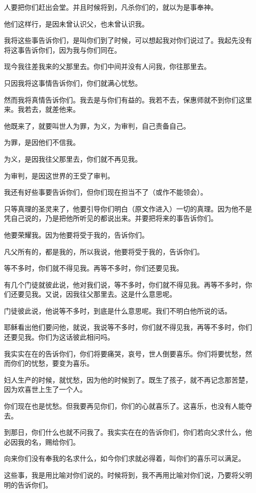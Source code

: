 \documentclass[12pt,oneside]{book}
\begin{document}
人要把你们赶出会堂。并且时候将到，凡杀你们的，就以为是事奉神。

他们这样行，是因未曾认识父，也未曾认识我。

我将这些事告诉你们，是叫你们到了时候，可以想起我对你们说过了。我起先没有将这事告诉你们，因为我与你们同在。

现今我往差我来的父那里去。你们中间并没有人问我，你往那里去。

只因我将这事情告诉你们，你们就满心忧愁。

然而我将真情告诉你们。我去是与你们有益的。我若不去，保惠师就不到你们这里来。我若去，就差他来。

他既来了，就要叫世人为罪，为义，为审判，自己责备自己。

为罪，是因他们不信我。

为义，是因我往父那里去，你们就不再见我。

为审判，是因这世界的王受了审判。

我还有好些事要告诉你们，但你们现在担当不了（或作不能领会）。

只等真理的圣灵来了，他要引导你们明白（原文作进入）一切的真理。因为他不是凭自己说的，乃是把他所听见的都说出来。并要把将来的事告诉你们。

他要荣耀我。因为他要将受于我的，告诉你们。

凡父所有的，都是我的，所以我说，他要将受于我的，告诉你们。

等不多时，你们就不得见我。再等不多时，你们还要见我。

有几个门徒就彼此说，他对我们说，等不多时，你们就不得见我。再等不多时，你们还要见我。又说，因我往父那里去。这是什么意思呢。

门徒彼此说，他说等不多时，到底是什么意思呢。我们不明白他所说的话。

耶稣看出他们要问他，就说，我说等不多时，你们就不得见我，再等不多时，你们还要见我。你们为这话彼此相问吗。

我实实在在的告诉你们，你们将要痛哭，哀号，世人倒要喜乐。你们将要忧愁，然而你们的忧愁，要变为喜乐。

妇人生产的时候，就忧愁，因为他的时候到了。既生了孩子，就不再记念那苦楚，因为欢喜世上生了一个人。

你们现在也是忧愁。但我要再见你们，你们的心就喜乐了。这喜乐，也没有人能夺去。

到那日，你们什么也就不问我了。我实实在在的告诉你们，你们若向父求什么，他必因我的名，赐给你们。

向来你们没有奉我的名求什么，如今你们求就必得着，叫你们的喜乐可以满足。

这些事，我是用比喻对你们说的。时候将到，我不再用比喻对你们说，乃要将父明明的告诉你们。
\end{document}
